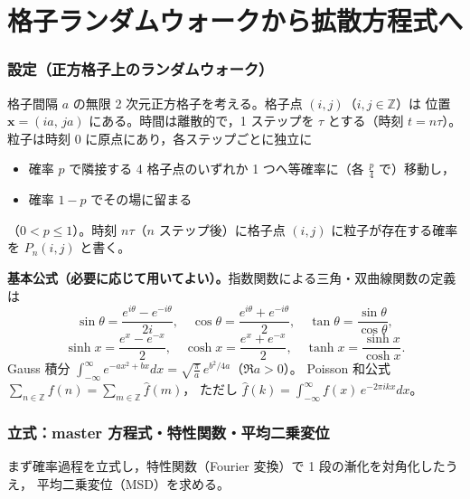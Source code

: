 \documentclass[dvipdfmx, uplatex]{jsarticle}
\newcommand{\bx}{\bm{x}}
\theoremstyle{definition}
\begin{document}
\part{格子ランダムウォークから拡散方程式へ}

\section{設定（正方格子上のランダムウォーク）}
格子間隔 $a$ の無限 2 次元正方格子を考える。格子点 $(i,j)$（$i,j\in\mathbb{Z}$）は
位置 $\bx=(ia,\,ja)$ にある。時間は離散的で，1 ステップを $\tau$ とする（時刻 $t=n\tau$）。
粒子は時刻 $0$ に原点にあり，各ステップごとに独立に
\begin{itemize}
\item 確率 $p$ で隣接する 4 格子点のいずれか 1 つへ等確率に（各 $\tfrac{p}{4}$ で）移動し，
\item 確率 $1-p$ でその場に留まる
\end{itemize}
（$0<p\le1$）。時刻 $n\tau$（$n$ ステップ後）に格子点 $(i,j)$ に粒子が存在する確率を
$P_n(i,j)$ と書く。

\medskip
\noindent\textbf{基本公式（必要に応じて用いてよい）。}指数関数による三角・双曲線関数の定義は
\[
    \sin\theta=\frac{e^{i\theta}-e^{-i\theta}}{2i},\quad
    \cos\theta=\frac{e^{i\theta}+e^{-i\theta}}{2},\quad
    \tan\theta=\frac{\sin\theta}{\cos\theta},
\]
\[
    \sinh x=\frac{e^{x}-e^{-x}}{2},\quad
    \cosh x=\frac{e^{x}+e^{-x}}{2},\quad
    \tanh x=\frac{\sinh x}{\cosh x}.
\]
Gauss 積分 $\displaystyle\int_{-\infty}^{\infty}e^{-ax^2+bx}dx=\sqrt{\tfrac{\pi}{a}}\,e^{b^2/4a}$（$\Re a>0$）。
Poisson 和公式 $\displaystyle\sum_{n\in\mathbb{Z}}f(n)=\sum_{m\in\mathbb{Z}}\hat f(m)$，
ただし $\hat f(k)=\int_{-\infty}^{\infty}f(x)\,e^{-2\pi i kx}dx$。

\section{立式：master 方程式・特性関数・平均二乗変位}
まず確率過程を立式し，特性関数（Fourier 変換）で 1 段の漸化を対角化したうえ，
平均二乗変位（MSD）を求める。
\end{document}
